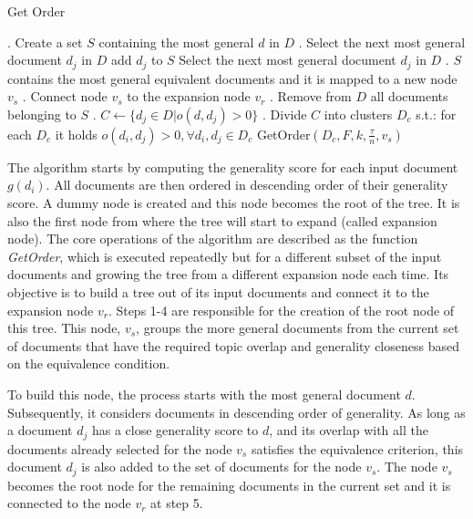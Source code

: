 \documentclass[12pt,twoside]{article}
\begin{document}
	\begin{algorithm}
    \caption{Get Order}
    \begin{algorithmic}[1]
    
        . Create a set $S$ containing the most general $d$ in $D$
        . Select the next most general document $d_j$ in $D$
             add $d_j$ to $S$\EndIf
            \State Select the next most general document $d_j$ in $D$
        \EndWhile
        . $S$ contains the most general equivalent documents
        \State and it is mapped to a new node $v_s$
        . Connect node $v_s$ to the expansion node $v_r$
        . Remove from $D$ all documents belonging to $S$
        . $C \leftarrow \{ d_j \in D | o(d, d_j ) > 0 \}$
        . Divide $C$ into clusters $D_c$ s.t.: 
        \State for each $D_c$ it holds $o(d_i, d_j ) > 0, \forall d_i, d_j \in D_c$
            \State GetOrder$(D_c, F, k, \frac{\tau}{n}, v_s)$
        \EndForAll
    \end{algorithmic}
    \end{algorithm}
	
	The algorithm starts by computing the generality score for each input document $g(d_i).$ All documents are then ordered in descending order of their generality score. A dummy node is created and this node becomes the root of the tree. It is also the first node from where the tree will start to expand (called expansion node). The core operations of the algorithm are described as the function \textit{GetOrder}, which is executed repeatedly but for a different subset of the input documents and growing the tree from a different expansion node each time. Its objective is to build a tree out of its input documents and connect it to the expansion node $v_r$. Steps 1-4 are responsible for the creation of the root node of this tree. This node, $v_s$, groups the more general documents from the current set of documents that have the required topic overlap and generality closeness based on the equivalence condition.
	
	To build this node, the process starts with the most general document $d$. Subsequently, it considers documents in descending order of generality. As long as a document $d_j$ has a close generality score to $d$, and its overlap with all the documents already selected for the node $v_s$ satisfies the equivalence criterion, this document $d_j$ is also added to the set of documents for the node $v_s$. The node $v_s$ becomes the root node for the remaining documents in the current set and it is connected to the node $v_r$ at step 5. 
	
\end{document}
